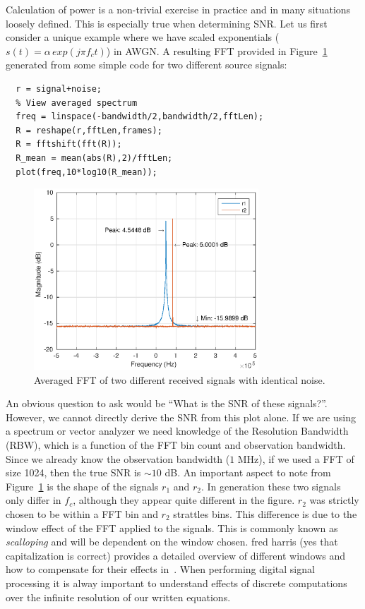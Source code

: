 \documentclass[letterpaper,12pt]{article}
\begin{document}
%
Calculation of power is a non-trivial exercise in practice and in many situations loosely defined. This is especially true when determining SNR. Let us first consider a unique example where we have scaled exponentials ($s(t) = \alpha\,exp(j\pi f_c t)$) in AWGN. A resulting FFT provided in Figure~\ref{fig:snr_guess} generated from some simple code for two different source signals:\par
%
\begin{minipage}{\linewidth}
\begin{lstlisting}
  r = signal+noise;
  % View averaged spectrum
  freq = linspace(-bandwidth/2,bandwidth/2,fftLen);
  R = reshape(r,fftLen,frames);
  R = fftshift(fft(R));
  R_mean = mean(abs(R),2)/fftLen;
  plot(freq,10*log10(R_mean));
\end{lstlisting}
\end{minipage}
%
\begin{figure}[htp!]
\centering
\includegraphics[width=0.75\textwidth]{snr_guess_dual.eps}
\caption{Averaged FFT of two different received signals with identical noise.}\label{fig:snr_guess}
\end{figure}
%
\par An obvious question to ask would be ``What is the SNR of these signals?''.  However, we cannot directly derive the SNR from this plot alone.  If we are using a spectrum or vector analyzer we need knowledge of the Resolution Bandwidth (RBW), which is a function of the FFT bin count and observation bandwidth. Since we already know the observation bandwidth ($1$ MHz), if we used a FFT of size 1024, then the true SNR is $\sim 10$ dB. An important aspect to note from Figure~\ref{fig:snr_guess} is the shape of the signals $r_1$ and $r_2$. In generation these two signals only differ in $f_c$, although they appear quite different in the figure. $r_2$ was strictly chosen to be within a FFT bin and $r_2$ strattles bins. This difference is due to the window effect of the FFT applied to the signals. This is commonly known as \textit{scalloping} and will be dependent on the window chosen. fred harris (yes that capitalization is correct) provides a detailed overview of different windows and how to compensate for their effects in~\cite{harris1978}. When performing digital signal processing it is alway important to understand effects of discrete computations over the infinite resolution of our written equations.\par
\end{document}
